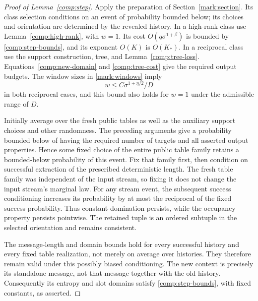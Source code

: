\begin{proof}[Proof of Lemma~\ref{comp:step}]
Apply the preparation of Section~\ref{mark:section}.
Its class selection conditions on an event of probability
bounded below; its choices and orientation are determined
by the revealed history. In a high-rank class use
Lemma~\ref{comp:high-rank}, with \(w=1\).
Its cost \(O(q\sigma^{1+\beta})\) is bounded by
\eqref{comp:step-bounds}, and its exponent \(O(K)\)
is \(O(K_*)\).
In a reciprocal class use the support construction,
tree, and Lemma~\ref{comp:tree-loss}.
Equations~\eqref{comp:new-domain} and
\eqref{comp:tree-cost} give the required output budgets.
The window sizes in \eqref{mark:windows} imply
\[
 w\le C\sigma^{1+\eta/2}/D
\]
in both reciprocal cases, and this bound also holds
for \(w=1\) under the admissible range of \(D\).

Initially average over the fresh public tables as well
as the auxiliary support choices and other randomness.
The preceding arguments give a probability bounded
below of having the required number of targets and
all asserted output properties. Hence some fixed
choice of the entire public table family retains a
bounded-below probability of this event. Fix that
family first, then condition on successful extraction
of the prescribed deterministic length.
The fresh table family was independent of the input stream,
so fixing it does not change the input stream's marginal law.
For any stream event, the subsequent success conditioning increases its
probability by at most the reciprocal of the fixed
success probability. Thus constant domination
persists, while the occupancy property persists
pointwise. The retained tuple is an ordered subtuple
in the selected orientation and remains consistent.

The message-length and domain bounds hold for every
successful history and every fixed table realization,
not merely on average over histories. They therefore
remain valid under this possibly biased conditioning.
The new context is precisely its standalone message,
not that message together with the old history.
Consequently its entropy and slot domains satisfy
\eqref{comp:step-bounds}, with fixed constants, as
asserted.
\end{proof}
